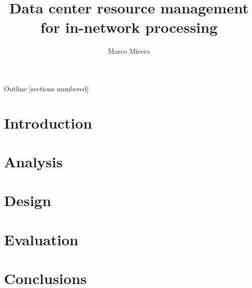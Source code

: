 

\title{Data center resource management for in-network processing}
\date{} %
\author{Marco Micera}



\maketitle

\begin{frame}{Outline}
  [sections numbered]
  \tableofcontents[hideallsubsections]
\end{frame}

\section{Introduction}


\section{Analysis}



\section{Design}


\section{Evaluation}


\section{Conclusions}





